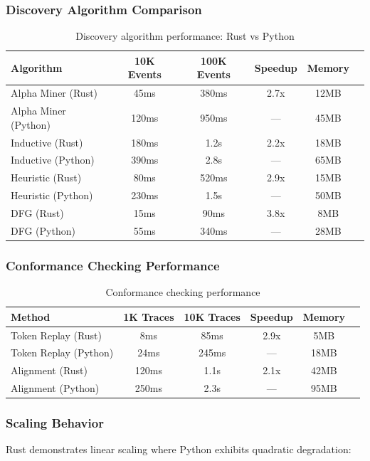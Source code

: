 \documentclass[11pt,twocolumn]{article}
\begin{document}
\subsubsection{Discovery Algorithm Comparison}
\begin{table}[H]
\centering
\begin{tabular}{lccccc}
\toprule
\textbf{Algorithm} & \textbf{10K Events} & \textbf{100K Events} & \textbf{Speedup} & \textbf{Memory} \\
\midrule
Alpha Miner (Rust) & 45ms & 380ms & 2.7x & 12MB \\
Alpha Miner (Python) & 120ms & 950ms & — & 45MB \\
\midrule
Inductive (Rust) & 180ms & 1.2s & 2.2x & 18MB \\
Inductive (Python) & 390ms & 2.8s & — & 65MB \\
\midrule
Heuristic (Rust) & 80ms & 520ms & 2.9x & 15MB \\
Heuristic (Python) & 230ms & 1.5s & — & 50MB \\
\midrule
DFG (Rust) & 15ms & 90ms & 3.8x & 8MB \\
DFG (Python) & 55ms & 340ms & — & 28MB \\
\bottomrule
\end{tabular}
\caption{Discovery algorithm performance: Rust vs Python}
\label{tbl:discovery}
\end{table}

\subsubsection{Conformance Checking Performance}
\begin{table}[H]
\centering
\begin{tabular}{lccccc}
\toprule
\textbf{Method} & \textbf{1K Traces} & \textbf{10K Traces} & \textbf{Speedup} & \textbf{Memory} \\
\midrule
Token Replay (Rust) & 8ms & 85ms & 2.9x & 5MB \\
Token Replay (Python) & 24ms & 245ms & — & 18MB \\
\midrule
Alignment (Rust) & 120ms & 1.1s & 2.1x & 42MB \\
Alignment (Python) & 250ms & 2.3s & — & 95MB \\
\bottomrule
\end{tabular}
\caption{Conformance checking performance}
\label{tbl:conformance}
\end{table}

\subsubsection{Scaling Behavior}
Rust demonstrates linear scaling where Python exhibits quadratic degradation:
\end{document}
